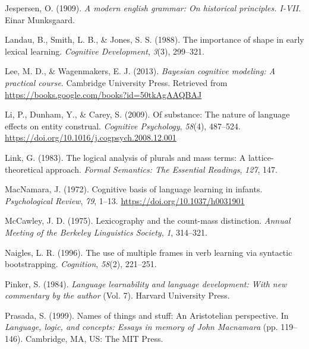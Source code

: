 \documentclass[
  man,floatsintext]{apa6}
\newlength{\cslhangindent}
\newlength{\cslentryspacingunit} %
\newenvironment{CSLReferences}[2] %
 {%
  \setlength{\parindent}{0pt}
  \ifodd #1
  \let\oldpar\par
  \def\par{\hangindent=\cslhangindent\oldpar}
  \fi
  \setlength{\parskip}{#2\cslentryspacingunit}
 }%
 {}
\begin{document}
\begin{CSLReferences}{1}{0}
\leavevmode{}%
Jespersen, O. (1909). \emph{A modern english grammar: On historical principles. I-VII}. Einar Munksgaard.

\leavevmode{}%
Landau, B., Smith, L. B., \& Jones, S. S. (1988). The importance of shape in early lexical learning. \emph{Cognitive Development}, \emph{3}(3), 299--321.

\leavevmode{}%
Lee, M. D., \& Wagenmakers, E. J. (2013). \emph{Bayesian cognitive modeling: A practical course}. Cambridge University Press. Retrieved from \url{https://books.google.com/books?id=50tkAgAAQBAJ}

\leavevmode{}%
Li, P., Dunham, Y., \& Carey, S. (2009). Of substance: {The} nature of language effects on entity construal. \emph{Cognitive Psychology}, \emph{58}(4), 487--524. \url{https://doi.org/10.1016/j.cogpsych.2008.12.001}

\leavevmode{}%
Link, G. (1983). The logical analysis of plurals and mass terms: A lattice-theoretical approach. \emph{Formal Semantics: The Essential Readings}, \emph{127}, 147.

\leavevmode{}%
MacNamara, J. (1972). Cognitive basis of language learning in infants. \emph{Psychological Review}, \emph{79}, 1--13. \url{https://doi.org/10.1037/h0031901}

\leavevmode{}%
McCawley, J. D. (1975). Lexicography and the count-mass distinction. \emph{Annual Meeting of the Berkeley Linguistics Society}, \emph{1}, 314--321.

\leavevmode{}%
Naigles, L. R. (1996). The use of multiple frames in verb learning via syntactic bootstrapping. \emph{Cognition}, \emph{58}(2), 221--251.

\leavevmode{}%
Pinker, S. (1984). \emph{Language learnability and language development: With new commentary by the author} (Vol. 7). Harvard University Press.

\leavevmode{}%
Prasada, S. (1999). Names of things and stuff: {An} {Aristotelian} perspective. In \emph{Language, logic, and concepts: {Essays} in memory of {John} {Macnamara}} (pp. 119--146). Cambridge, MA, US: The MIT Press.


\end{CSLReferences}
\end{document}
